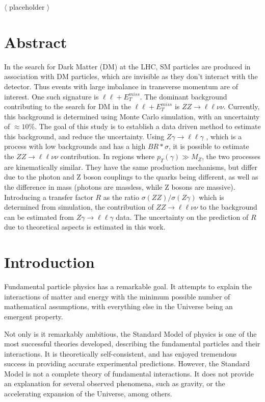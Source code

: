 \documentclass[11pt,a4paper,openright,twoside]{report}
\newcommand{\ZZ}{$ZZ\to \ell\ell\nu\nu$ }
\newcommand{\Zg}{$Z\gamma\to \ell\ell\gamma$ }
\newcommand\blankpage{%
    \null
    \thispagestyle{empty}%
    \addtocounter{page}{-1}%
    \newpage}
\begin{document}
$\langle$ placeholder $\rangle$

\newpage
\blankpage
\newpage

\chapter*{Abstract}
\setcounter{page}{1}
In the search for Dark Matter (DM) at the LHC, SM particles are produced in association with DM particles, which are invisible as they don't interact with the detector. Thus events with large imbalance in transverse momentum are of interest. One such signature is $\ell\ell + E_T^{miss}$. The dominant background contributing to the search for DM in the $\ell\ell + E_T^{miss}$ is $ZZ \rightarrow \ell\ell\nu\nu$.  Currently, this background is determined using Monte Carlo simulation, with an uncertainty of $\approx 10\%$. The goal of this study is to establish a data driven method to estimate this background, and reduce the uncertainty. Using \Zg, which is a process with low backgrounds and has a high $BR*\sigma$, it is possible to estimate the \ZZ contribution. In regions where $p_{T}(\gamma) \gg M_{Z}$, the two processes are kinematically similar. They have the same production mechanisms, but differ due to the photon and Z boson couplings to the quarks being different, as well as the difference in mass (photons are massless, while Z bosons are massive). Introducing a transfer factor $R$ as the ratio $\sigma(ZZ)/\sigma(Z\gamma)$ which is determined from simulation, the contribution of \ZZ to the background can be estimated from \Zg data. The uncertainty on the prediction of $R$ due to theoretical aspects is estimated in this work.
\thispagestyle{plain}
\tableofcontents
\thispagestyle{empty}
\cleardoublepage
{}
\chapter{Introduction}
\pagestyle{plain}
\setcounter{page}{1}
Fundamental particle physics has a remarkable goal. It attempts to explain the interactions of matter and energy with the minimum possible number of mathematical assumptions, with everything else in the Universe being an emergent property.

Not only is it remarkably ambitious, the Standard Model of physics is one of the most successful theories developed, describing the fundamental particles and their interactions\cite{griff}. It is theoretically self-consistent, and has enjoyed tremendous success in providing accurate experimental predictions. However, the Standard Model is not a complete theory of fundamental interactions. It does not provide an explanation for several observed phenomena, such as gravity, or the accelerating expansion of the Universe, among others.
\end{document}
